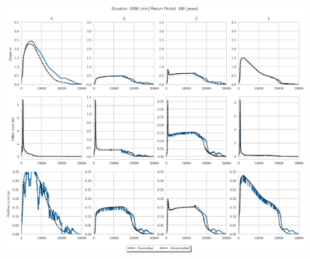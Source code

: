 \begin{figure}
    \centering
    \includegraphics[width=\linewidth]{./RL-SI-figures/77storms/0360100.eps}
\end{figure}


